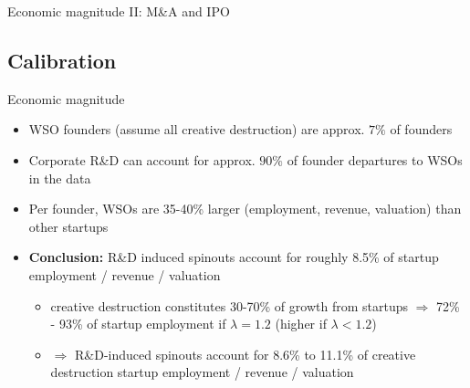 \documentclass[english,usenames,dvipsnames]{beamer}
\begin{document}
\begin{frame}{Economic magnitude II: M\&A and IPO}\label{regs_startup_lifecycle_successfullyexiting}
	\hyperlink{economic_magnitude}{}
	\begin{table}[!htb]
		\Tiny
		\centering
		
		\caption{\footnotesize Dependent variable is an indicator for the startup being acquired or having an IPO in that year. Indepdendent variable is fraction of founders whose previous employer was in the same industry.} 
		\label{table:startupLifeCycle_founder2founders_successfullyexiting}
	\end{table}
\end{frame}


\subsection{Calibration}

\begin{frame}{Economic magnitude}\label{economic_magnitude}
	\hyperlink{calibration_overview}{}
	\begin{itemize}
		\item WSO founders (assume all creative destruction) are approx. $7\%$ of founders  \hyperlink{results_of_match}{}
		\item Corporate R\&D can account for approx. $90\%$ of founder departures to WSOs in the data \hyperlink{regs_economic_significance}{}
		\item Per founder, WSOs are 35-40\% larger (employment, revenue, valuation) than other startups \hyperlink{regs_startup_lifecycle_employment}{} \hyperlink{regs_startup_lifecycle_revenue}{} \hyperlink{regs_startup_lifecycle_valuation}{}  \hyperlink{regs_startup_lifecycle_goingoutofbusiness}{} \hyperlink{regs_startup_lifecycle_successfullyexiting}{} 
		\item \alert{\textbf{Conclusion:}} R\&D induced spinouts account for roughly 8.5\% of startup employment / revenue / valuation
		\begin{itemize}
			\item creative destruction constitutes 30-70\% of growth from startups $\Rightarrow$ 72\% - 93\% of startup employment if $\lambda = 1.2$ (higher if $\lambda < 1.2$)
			\item $\Rightarrow$ R\&D-induced spinouts account for 8.6\% to 11.1\% of creative destruction startup employment / revenue / valuation
		\end{itemize}
	\end{itemize}
\end{frame}
\end{document}
